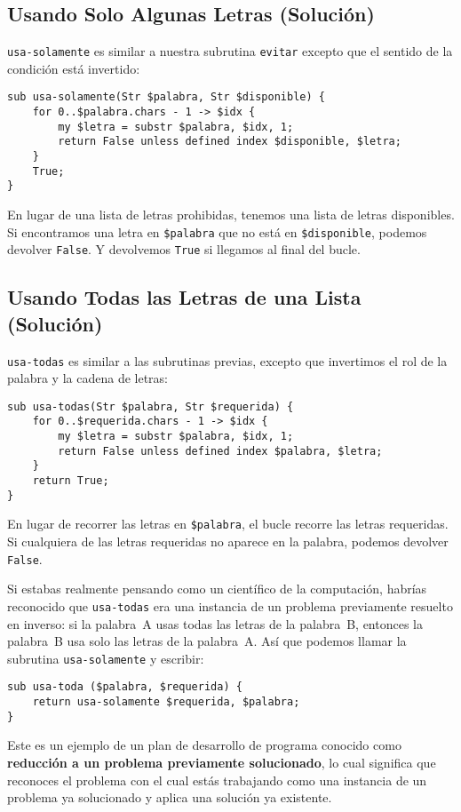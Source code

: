 \subsection{Usando Solo Algunas Letras (Solución)}

\verb"usa-solamente" es similar a nuestra subrutina {\tt evitar} 
excepto que el sentido de la condición está invertido:

\begin{verbatim}
sub usa-solamente(Str $palabra, Str $disponible) {
    for 0..$palabra.chars - 1 -> $idx {
        my $letra = substr $palabra, $idx, 1;
        return False unless defined index $disponible, $letra;
    }
    True;
}
\end{verbatim}
%
En lugar de una lista de letras prohibidas, tenemos una lista
de letras disponibles. Si encontramos una letra en {\tt \$palabra}
que no está en {\tt \$disponible}, podemos devolver {\tt False}. 
Y devolvemos {\tt True} si llegamos al final del bucle.

\subsection{Usando Todas las Letras de una Lista (Solución)}

\verb"usa-todas" es similar a las subrutinas previas,
excepto que invertimos el rol de la palabra y la cadena 
de letras:

\begin{verbatim}
sub usa-todas(Str $palabra, Str $requerida) {
    for 0..$requerida.chars - 1 -> $idx {
        my $letra = substr $palabra, $idx, 1;
        return False unless defined index $palabra, $letra;
    }
    return True;
}
\end{verbatim}
%
En lugar de recorrer las letras en {\tt \$palabra}, el bucle
recorre las letras requeridas. Si cualquiera de las letras
requeridas no aparece en la palabra, podemos devolver {\tt False}.

Si estabas realmente pensando como un científico de la computación, 
habrías reconocido que \verb|usa-todas| era una instancia de un
problema previamente resuelto en inverso: si la palabra~A usas todas
las letras de la palabra~B,  entonces la palabra~B usa solo las letras
de la palabra~A. Así que podemos llamar la subrutina {\tt usa-solamente}
y escribir:

\begin{verbatim}
sub usa-toda ($palabra, $requerida) {
    return usa-solamente $requerida, $palabra;
}
\end{verbatim}
%
Este es un ejemplo de un plan de desarrollo de programa conocido como
{\bf reducción a un problema previamente solucionado}, lo cual 
significa que reconoces el problema con el cual estás trabajando
como una instancia de un problema ya solucionado y aplica una
solución ya existente. 

